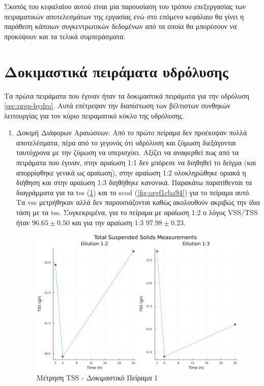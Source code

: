 \documentclass[11pt]{report}
\begin{document}
Σκοπός του κεφαλαίου αυτού είναι μία παρουσίαση του τρόπου επεξεργασίας των πειραματικών αποτελεσμάτων της εργασίας ενώ στο επόμενο κεφάλαιο θα γίνει η παράθεση κάποιων συγκεντρωτικών δεδομένων από τα οποία θα μπορέσουν να προκύψουν και τα τελικά συμπεράσματα.

\section{Δοκιμαστικά πειράματα υδρόλυσης}
\label{sec:org369857c}
Τα πρώτα πειράματα που έγιναν ήταν τα δοκιμαστικά πειράματα για την υδρόλυση \autoref{sec:prep-hydro}. Αυτά επέτρεψαν την διαπίστωση των βέλτιστων συνθηκών λειτουργίας για τον κύριο πειραματικό κύκλο της υδρόλυσης.

\begin{enumerate}
\item Δοκιμή Διάφορων Αραιώσεων:
\label{sec:org7d06ba9}
Από το πρώτο πείραμα δεν προέκυψαν πολλά αποτελέσματα, πέρα από το γεγονός ότι υδρόλυση και ζύμωση διεξάγονται ταυτόχρονα με την ζύμωση να υπερισχύει. Αξίζει να αναφερθεί πως από τα πειράματα που έγιναν, στην αραίωση 1:1 δεν μπόρεσε να διηθηθεί το δείγμα (και απορρίφθηκε γενικά ως αραίωση), στην αραίωση 1:2 ολοκληρώθηκε οριακά η διήθηση και στην αραίωση 1:3 διηθήθηκε κανονικά. Παρακάτω παρατίθενται τα διαγράμματα για τα \acrfull{tss} (\ref{fig:org143fab6}) και το \acrfull{scod} (\ref{fig:orgf1cba94}) για το πείραμα αυτό. Τα \acrfull{vss} μετρήθηκαν αλλά δεν παρουσιάζονται καθώς ακολουθούν ακριβώς την ίδια τάση με τα \acrfull{tss}. Συγκεκριμένα, για το πείραμα με αραίωση 1:2 ο λόγος VSS/TSS ήταν \(96.65 \pm 0.50\) και για την αραίωση 1:3 \(97.98 \pm 0.23\). 

\begin{figure}[htbp]
\centering
\includegraphics[width=.9\linewidth]{../plots/10_10/tss_plot.png}
\caption{\label{fig:org143fab6}Μέτρηση TSS - Δοκιμαστικό Πείραμα 1}
\end{figure}


\end{enumerate}
\end{document}
